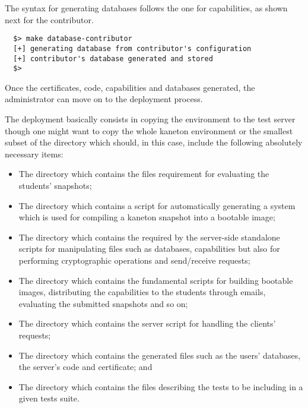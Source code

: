 The syntax for generating databases follows the one for capabilities, as
shown next for the contributor.

\begin{verbatim}
  $> make database-contributor
  [+] generating database from contributor's configuration
  [+] contributor's database generated and stored
  $> 
\end{verbatim}

Once the certificates, code, capabilities and databases generated, the
administrator can move on to the deployment process.


The deployment basically consists in copying the  environment
to the test server though one might want to copy the whole kaneton environment
or the smallest subset of the  directory which should, in this
case, include the following absolutely necessary items:

\begin{itemize}
  \item
    The  directory which contains the files requirement
    for evaluating the students' snapshots;
  \item
    The  directory which contains a script for
    automatically generating a  system which is used
    for compiling a kaneton snapshot into a bootable image;
  \item
    The  directory which contains the  required by the server-side standalone scripts
    for manipulating files such as databases, capabilities \etc{} but also
    for performing cryptographic operations and send/receive 
    requests;
  \item
    The  directory which contains the fundamental
    scripts for building bootable images, distributing the capabilities to
    the students through emails, evaluating the submitted snapshots and so on;
  \item
    The  directory which contains the server script
    for handling the clients' requests;
  \item
    The  directory which contains the generated files
    such as the users' databases, the server's code and certificate; and
  \item
    The  directory which contains the files describing
    the tests to be including in a given tests suite.
\end{itemize}

